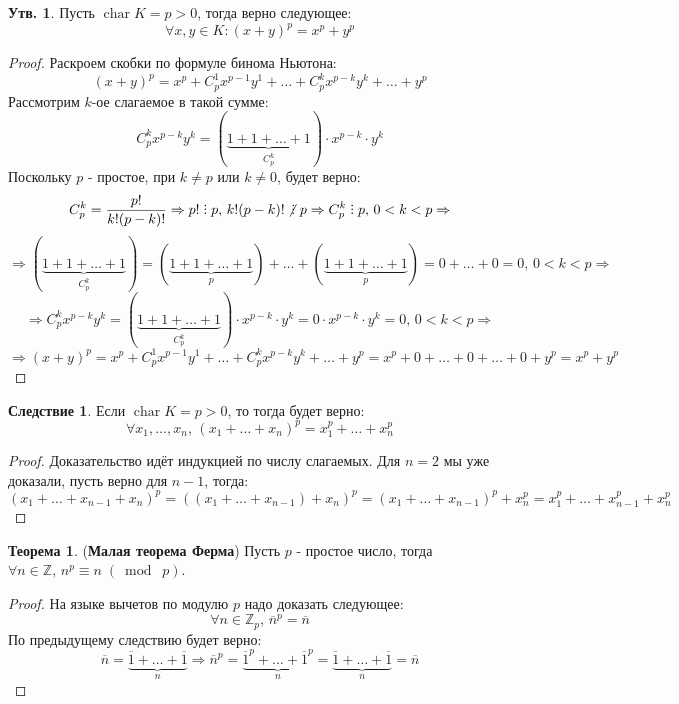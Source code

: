 \documentclass[12pt]{article}
\newcommand{\MZ}{\mathbb{Z}}
\theoremstyle{definition}
\newtheorem{prop}{Утв.}
\newtheorem{theorem}{Теорема}
\newtheorem{corollary}{Следствие}
\DeclareRobustCommand{\divby}{%
	\mathrel{\text{\vbox{\baselineskip.65ex\lineskiplimit0pt\hbox{.}\hbox{.}\hbox{.}}}}%
}
\DeclareRobustCommand{\ndivby}{\mkern-1mu\not\mathrel{\mkern4.5mu\divby}\mkern1mu}
\newcommand{\ovl}[1]{\overline{#1}}
\DeclareMathOperator{\Char}{\operatorname{char}}
\newcommand{\modn}[3]{#1 \equiv #2 \; (\bmod \; #3)}
\begin{document}
\begin{prop}
	Пусть $\Char{K} = p > 0$, тогда верно следующее:
	$$
		\forall x,y \in K \colon (x + y)^p = x^p + y^p
	$$
\end{prop}
\begin{proof}
	Раскроем скобки по формуле бинома Ньютона:
	$$
		(x + y)^p = x^p + C_p^1 x^{p-1}y^1 + \dotsc  + C_p^k x^{p-k}y^{k} + \dotsc  + y^p 
	$$
	Рассмотрим $k$-ое слагаемое в такой сумме:
	$$
		C_p^k x^{p-k}y^{k} = (\underbrace{1 + 1 + \dotsc + 1}_{C_p^k}){\cdot}x^{p-k}{\cdot}y^k
	$$
	Поскольку $p$ - простое, при $k \neq p$ или $k\neq 0$, будет верно:
	$$
		C_p^k = \dfrac{p!}{k!(p-k)!} \Rightarrow p! \divby p, \, k!(p-k)! \ndivby p \Rightarrow C_p^k \divby p, \, 0 < k < p \Rightarrow
	$$
	$$
		\Rightarrow (\underbrace{1 + 1 + \dotsc + 1}_{C_p^k}) = (\underbrace{1 + 1 + \dotsc + 1}_{p}) + \dotsc + (\underbrace{1 + 1 + \dotsc + 1}_{p}) = 0  + \dotsc + 0 = 0, \, 0 < k < p \Rightarrow
	$$
	$$
		\Rightarrow C_p^k x^{p-k}y^{k} = (\underbrace{1 + 1 + \dotsc + 1}_{C_p^k}){\cdot}x^{p-k}{\cdot}y^k = 0{\cdot}x^{p-k}{\cdot}y^k = 0, \, 0 < k < p \Rightarrow
	$$
	$$
		\Rightarrow (x + y)^p = x^p + C_p^1 x^{p-1}y^1 + \dotsc  + C_p^k x^{p-k}y^{k} + \dotsc  + y^p = x^p + 0 + \dotsc +  0 + \dotsc + 0 + y^p = x^p + y^p
	$$
\end{proof}
\begin{corollary}
	Если $\Char{K} = p > 0$, то тогда будет верно: 
	$$
		\forall x_1, \dotsc, x_n, \, (x_1 + \dotsc + x_n)^p = x_1^p + \dotsc + x_n^p
	$$
\end{corollary}
\begin{proof}
	Доказательство идёт индукцией по числу слагаемых. Для $n = 2$ мы уже доказали, пусть верно для $n-1$, тогда:
	$$
		(x_1 + \dotsc + x_{n-1} +  x_n)^p = ((x_1 + \dotsc + x_{n-1}) + x_n)^p = (x_1 + \dotsc + x_{n-1})^p + x_n^p = x_1^p + \dotsc + x_{n-1}^p + x_n^p
	$$
\end{proof}

\begin{theorem}(\textbf{Малая теорема Ферма})
	Пусть $p$ - простое число, тогда $\forall n \in \MZ, \, \modn{n^p}{n}{p}$.
\end{theorem}
\begin{proof}
	На языке вычетов по модулю $p$ надо доказать следующее:
	$$
		\forall n \in \MZ_p, \, \ovl{n}^p = \ovl{n}
	$$
	По предыдущему следствию будет верно:
	$$
		\ovl{n} = \underbrace{\ovl{1} + \dotsc + \ovl{1}}_{n} \Rightarrow \ovl{n}^p = \underbrace{\ovl{1}^p + \dotsc + \ovl{1}^p}_{n} = \underbrace{\ovl{1} + \dotsc + \ovl{1}}_{n} = \ovl{n}
	$$
\end{proof}
\end{document}

